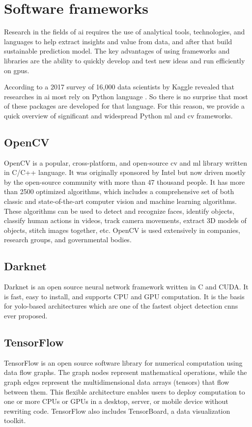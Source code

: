 \section{Software frameworks}
    Research in the fields of \gls{ai} requires the use of analytical tools, technologies, and languages to help extract insights and value from data, and after that build sustainable prediction model. The key advantages of using frameworks and libraries are the ability to quickly develop and test new ideas and run efficiently on \gls{gpu}s.

    According to a 2017 survey of 16,000 data scientists by Kaggle revealed that researches in  \gls{ai} most rely on Python language \cite{mostuseddatasciencetools}. So there is no surprise that most of these packages are developed for that language. For this reason, we provide a quick overview of significant and widespread Python \gls{ml} and \gls{cv} frameworks.
    
    \subsection{OpenCV}
        OpenCV \cite{opencv_library} is a popular, cross-platform, and open-source \gls{cv} and \gls{ml} library written in C/C++ language. It was originally sponsored by Intel but now driven mostly by the open-source community with more than 47 thousand people. It has more than 2500 optimized algorithms, which includes a comprehensive set of both classic and state-of-the-art computer vision and machine learning algorithms. These algorithms can be used to detect and recognize faces, identify objects, classify human actions in videos, track camera movements, extract 3D models of objects, stitch images together, etc. OpenCV is used extensively in companies, research groups, and governmental bodies. 
    
    \subsection{Darknet}
        Darknet \cite{darknet13} is an open source neural network framework written in C and CUDA. It is fast, easy to install, and supports CPU and GPU computation. It is the basis for \gls{yolo}-based architectures which are one of the fastest object detection \gls{cnn}s ever proposed. 

    \subsection{TensorFlow}
        TensorFlow \cite{abadi2016tensorflow} is an open source software library for numerical computation using data flow graphs. The graph nodes represent mathematical operations, while the graph edges represent the multidimensional data arrays (tensors) that flow between them. This flexible architecture enables users to deploy computation to one or more CPUs or GPUs in a desktop, server, or mobile device without rewriting code. TensorFlow also includes TensorBoard, a data visualization toolkit.

